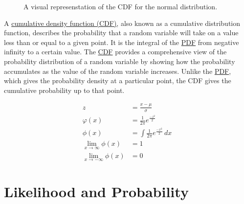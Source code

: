 \documentclass[
  a4paper,
]{scrbook}
\begin{document}
\begin{figure}[ht]


\caption{\label{fig-cdf-000-scr}A visual represenstation of the CDF for
the normal distribution.}

\end{figure}%

A \hyperref[CDF]{cumulative density function (CDF)}, also known as a
cumulative distribution function, describes the probability that a
random variable will take on a value less than or equal to a given
point. It is the integral of the \hyperref[acronyms_PDF]{PDF} from
negative infinity to a certain value. The \hyperref[acronyms_CDF]{CDF}
provides a comprehensive view of the probability distribution of a
random variable by showing how the probability accumulates as the value
of the random variable increases. Unlike the
\hyperref[acronyms_PDF]{PDF}, which gives the probability density at a
particular point, the CDF gives the cumulative probability up to that
point.

\begin{align}
z &= \frac{x-\mu}{\sigma} \nonumber \\
\varphi(x) &= \frac{1}{2\pi}e^{\frac{-z^2}{2}} \\
\phi(x)& = \int \frac{1}{2\pi}e^{\frac{-x^2}{2}} \, dx \\
\lim_{x\to\infty} \phi(x) &= 1 \nonumber \\
\lim_{x\to - \infty} \phi(x) &= 0 \nonumber
\end{align}

\section{Likelihood and Probability}\label{likelihood-and-probability}
\end{document}
